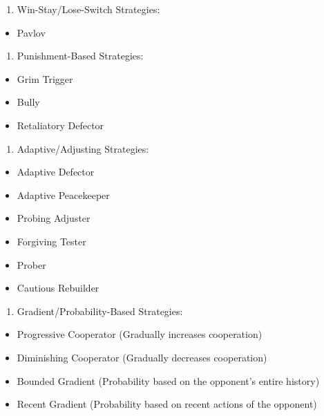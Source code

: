 \documentclass[11pt,preprint]{elsarticle}
\numberwithin{equation}{section}
\numberwithin{figure}{section}
\numberwithin{table}{section}
\def\tightlist{} %
\begin{document}
\begin{enumerate}
\def\labelenumi{\arabic{enumi}.}
\setcounter{enumi}{2}
\tightlist
\item
  Win-Stay/Lose-Switch Strategies:
\end{enumerate}

\begin{itemize}
\tightlist
\item
  Pavlov
\end{itemize}

\begin{enumerate}
\def\labelenumi{\arabic{enumi}.}
\setcounter{enumi}{3}
\tightlist
\item
  Punishment-Based Strategies:
\end{enumerate}

\begin{itemize}
\tightlist
\item
  Grim Trigger
\item
  Bully
\item
  Retaliatory Defector
\end{itemize}

\begin{enumerate}
\def\labelenumi{\arabic{enumi}.}
\setcounter{enumi}{4}
\tightlist
\item
  Adaptive/Adjusting Strategies:
\end{enumerate}

\begin{itemize}
\tightlist
\item
  Adaptive Defector
\item
  Adaptive Peacekeeper
\item
  Probing Adjuster
\item
  Forgiving Tester
\item
  Prober
\item
  Cautious Rebuilder
\end{itemize}

\begin{enumerate}
\def\labelenumi{\arabic{enumi}.}
\setcounter{enumi}{5}
\tightlist
\item
  Gradient/Probability-Based Strategies:
\end{enumerate}

\begin{itemize}
\tightlist
\item
  Progressive Cooperator (Gradually increases cooperation)
\item
  Diminishing Cooperator (Gradually decreases cooperation)
\item
  Bounded Gradient (Probability based on the opponent's entire history)
\item
  Recent Gradient (Probability based on recent actions of the opponent)
\end{itemize}
\end{document}
